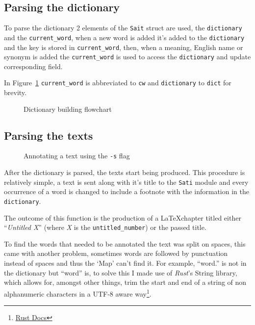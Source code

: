\documentclass[a4paper]{report}
\begin{document}
\subsection{Parsing the dictionary}\label{ssec:parsing-the-dict}

To parse the dictionary 2 elements of the \texttt{Sait} struct are used, the
\texttt{dictionary} and the \texttt{current\_word}, when a new word is added
it's added to the \texttt{dictionary} and the key is stored in
\texttt{current\_word}, then, when a meaning, English name or synonym is added
the \texttt{current\_word} is used to access the \texttt{dictionary} and update
corresponding field.

In Figure~\ref{fig:flow} \texttt{current\_word} is abbreviated to \texttt{cw}
and \texttt{dictionary} to \texttt{dict} for brevity.

\begin{figure}[H]
    \centering
    
    \caption{Dictionary building flowchart}\label{fig:flow}
\end{figure}

\subsection{Parsing the texts}

\begin{figure}
    \centering
    
    \caption{Annotating a text using the \texttt{-s} flag}
\end{figure}

After the dictionary is parsed, the texts start being produced. This procedure
is relatively simple, a text is sent along with it's title to the \texttt{Sati}
module and every occurrence of a word is changed to include a footnote with
the information in the \texttt{dictionary}.

The outcome of this function is the production of a \LaTeX chapter titled
either ``\textit{Untitled X}'' (where \textit{X} is the
\texttt{untitled\_number}) or the passed title.

To find the words that needed to be annotated the text was split on spaces,
this came with another problem, sometimes words are followed by punctuation
instead of spaces and thus the `Map' can't find it. For example, ``word.'' is
not in the dictionary but ``word'' is, to solve this I made use of
\textit{Rust}'s String library, which allows for, amongst other things, trim
the start and end of a string of non alphanumeric characters in a UTF-8 aware
way\footnote{\href{https://doc.rust-lang.org/std/primitive.str.html\#method.trim_start_matches}{Rust Docs}}.
\end{document}
